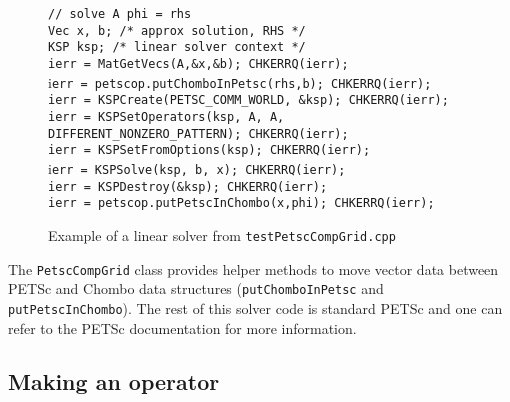 \begin{figure}[h]
\begin{flushleft}
\texttt{// solve A phi = rhs} \\
\texttt{Vec  x, b;      /* approx solution, RHS */} \\
\texttt{KSP  ksp;       /* linear solver context */} \\	
\texttt{ierr = MatGetVecs(A,\&x,\&b); CHKERRQ(ierr);} \\
i\texttt{err = petscop.putChomboInPetsc(rhs,b); CHKERRQ(ierr);} \\
\texttt{ierr = KSPCreate(PETSC\_COMM\_WORLD, \&ksp); CHKERRQ(ierr);} \\
\texttt{ierr = KSPSetOperators(ksp, A, A, DIFFERENT\_NONZERO\_PATTERN); CHKERRQ(ierr);} \\
\texttt{ierr = KSPSetFromOptions(ksp); CHKERRQ(ierr);} \\
i\texttt{err = KSPSolve(ksp, b, x); CHKERRQ(ierr);} \\
\texttt{ierr = KSPDestroy(\&ksp); CHKERRQ(ierr);} \\
\texttt{ierr = petscop.putPetscInChombo(x,phi); CHKERRQ(ierr);} \\
\caption{Example of a linear solver from \texttt{testPetscCompGrid.cpp}}
\label{fig:petsc_solver_example}
\end{flushleft}
\end{figure}

The \texttt{PetscCompGrid} class provides helper methods to move vector data between PETSc and Chombo data structures (\texttt{putChomboInPetsc} and \texttt{putPetscInChombo}).
The rest of this solver code is standard PETSc and one can refer to the PETSc documentation for more information.

\subsection{Making an operator}
\label{sec:petsc_op}

